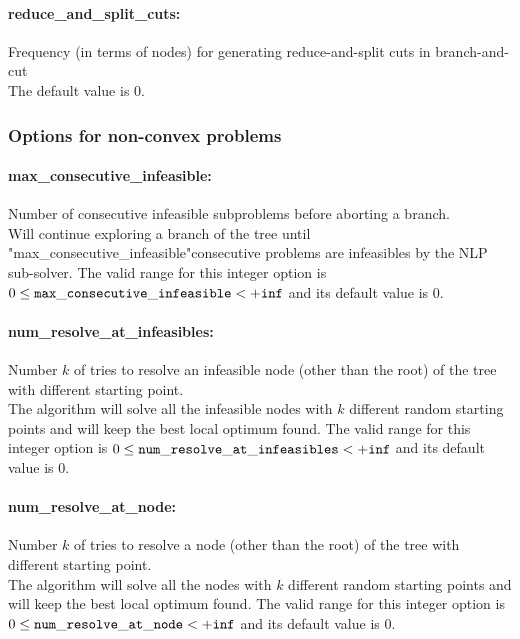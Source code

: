 \paragraph{reduce\_and\_split\_cuts:} Frequency (in terms of nodes) for generating reduce-and-split cuts in branch-and-cut $\;$ \\
The default value is $0$.

\subsubsection{Options for non-convex problems}
\label{sec:bonmin_options_for_non-convex_problems}
\paragraph{max\_consecutive\_infeasible:} Number of consecutive infeasible subproblems before aborting a branch. $\;$ \\
 Will continue exploring a branch of the tree
until "max\_consecutive\_infeasible"consecutive
problems are infeasibles by the NLP sub-solver. The valid range for this integer option is
$0 \le {\tt max\_consecutive\_infeasible } <  {\tt +inf}$
and its default value is $0$.


\paragraph{num\_resolve\_at\_infeasibles:} Number $k$ of tries to resolve an infeasible node (other than the root) of the tree with different starting point. $\;$ \\
 The algorithm will solve all the infeasible nodes
with $k$ different random starting points and
will keep the best local optimum found. The valid range for this integer option is
$0 \le {\tt num\_resolve\_at\_infeasibles } <  {\tt +inf}$
and its default value is $0$.


\paragraph{num\_resolve\_at\_node:} Number $k$ of tries to resolve a node (other than the root) of the tree with different starting point. $\;$ \\
 The algorithm will solve all the nodes with $k$
different random starting points and will keep
the best local optimum found. The valid range for this integer option is
$0 \le {\tt num\_resolve\_at\_node } <  {\tt +inf}$
and its default value is $0$.


